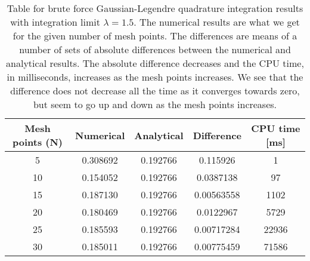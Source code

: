 \documentclass[12pt,a4paper,english]{article}
\begin{document}
\begin{table}[htbp]
	\centering
	\begin{tabular}{ |c|c|c|c|c| }
		\hline \rule{0pt}{13pt}
		Mesh points (N) & Numerical & Analytical & Difference & CPU time [ms]\\
		\hline \rule{0pt}{13pt}
		5 & 0.308692 & 0.192766 & 0.115926 & 1 \\
		\hline \rule{0pt}{13pt}
		10 & 0.154052 & 0.192766 & 0.0387138 & 97 \\
		\hline \rule{0pt}{13pt}
		15 & 0.187130 & 0.192766 & 0.00563558 & 1102 \\
		\hline \rule{0pt}{13pt}
		20 & 0.180469 & 0.192766 & 0.0122967 & 5729 \\
		\hline \rule{0pt}{13pt}
		25 & 0.185593 & 0.192766 & 0.00717284 & 22936 \\
		\hline \rule{0pt}{13pt}
		30 & 0.185011 & 0.192766 & 0.00775459 & 71586 \\
		\hline 
	\end{tabular}	
	\caption{Table for brute force Gaussian-Legendre quadrature integration results with integration limit $\lambda=1.5$. The numerical results are what we get for the given number of mesh points. The differences are means of a number of sets of absolute differences between the numerical and analytical results. The absolute difference decreases and the CPU time, in milliseconds, increases as the mesh points increases. We see that the difference does not decrease all the time as it converges towards zero, but seem to go up and down as the mesh points increases.}
	\label{tab:Gauss_Leg}
\end{table}
\end{document}
